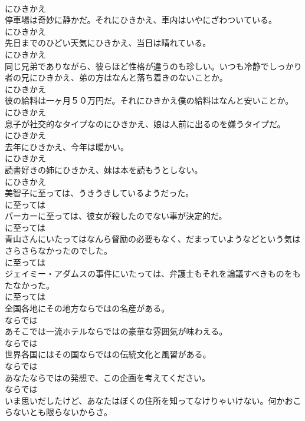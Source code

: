 \documentclass[8pt]{extreport}
\begin{document}
\begin{CJK}{UTF8}{min}
\\	にひきかえ	
\\	停車場は奇妙に静かだ。それにひきかえ、車内はいやにざわついている。	
\\	にひきかえ	
\\	先日までのひどい天気にひきかえ、当日は晴れている。	
\\	にひきかえ	
\\	同じ兄弟でありながら、彼らほど性格が違うのも珍しい。いつも冷静でしっかり者の兄にひきかえ、弟の方はなんと落ち着きのないことか。	
\\	にひきかえ	
\\	彼の給料は一ヶ月５０万円だ。それにひきかえ僕の給料はなんと安いことか。	
\\	にひきかえ	
\\	息子が社交的なタイプなのにひきかえ、娘は人前に出るのを嫌うタイプだ。	
\\	にひきかえ	
\\	去年にひきかえ、今年は暖かい。	
\\	にひきかえ	
\\	読書好きの姉にひきかえ、妹は本を読もうとしない。	
\\	にひきかえ	
\\	美智子に至っては、うきうきしているようだった。	
\\	に至っては	
\\	パーカーに至っては、彼女が殺したのでない事が決定的だ。	
\\	に至っては	
\\	青山さんにいたってはなんら督励の必要もなく、だまっていようなどという気はさらさらなかったのでした。	
\\	に至っては	
\\	ジェイミー・アダムスの事件にいたっては、弁護士もそれを論議すべきものをもたなかった。	
\\	に至っては	
\\	全国各地にその地方ならではの名産がある。	
\\	ならでは	
\\	あそこでは一流ホテルならではの豪華な雰囲気が味わえる。	
\\	ならでは	
\\	世界各国にはその国ならではの伝統文化と風習がある。	
\\	ならでは	
\\	あなたならではの発想で、この企画を考えてください。	
\\	ならでは	
\\	いま思いだしたけど、あなたはぼくの住所を知ってなけりゃいけない。何かおこらないとも限らないからさ。	

\end{CJK}
\end{document}
